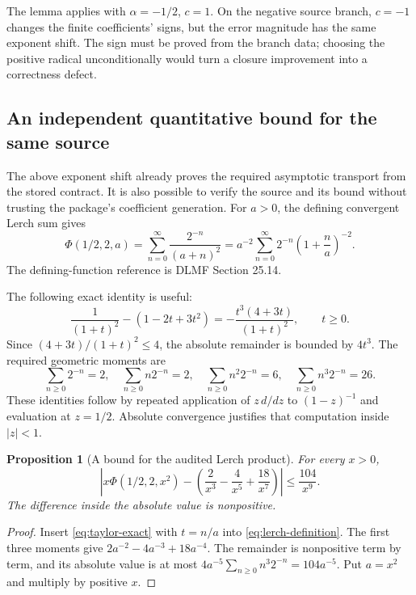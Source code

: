 \documentclass[11pt,a4paper]{article}
\newtheorem{proposition}{Proposition}[section]
\begin{document}
The lemma applies with $\alpha=-1/2$, $c=1$. On the negative source branch, $c=-1$ changes the finite coefficients' signs, but the error magnitude has the same exponent shift. The sign must be proved from the branch data; choosing the positive radical unconditionally would turn a closure improvement into a correctness defect.

\subsection{An independent quantitative bound for the same source}
The above exponent shift already proves the required asymptotic transport from the stored contract. It is also possible to verify the source and its bound without trusting the package's coefficient generation. For $a>0$, the defining convergent Lerch sum gives
\begin{equation}
 \Phi(1/2,2,a)=\sum_{n=0}^{\infty}\frac{2^{-n}}{(a+n)^2}
 =a^{-2}\sum_{n=0}^{\infty}2^{-n}\left(1+\frac n a\right)^{-2}.
 \label{eq:lerch-definition}
\end{equation}
The defining-function reference is DLMF Section 25.14.\cite{dlmf-lerch}

The following exact identity is useful:
\begin{equation}
 \frac{1}{(1+t)^2}-(1-2t+3t^2)
 =-\frac{t^3(4+3t)}{(1+t)^2},\qquad t\ge0.
 \label{eq:taylor-exact}
\end{equation}
Since $(4+3t)/(1+t)^2\le4$, the absolute remainder is bounded by $4t^3$. The required geometric moments are
\begin{equation}
 \sum_{n\ge0}2^{-n}=2,\quad
 \sum_{n\ge0}n2^{-n}=2,\quad
 \sum_{n\ge0}n^2 2^{-n}=6,\quad
 \sum_{n\ge0}n^3 2^{-n}=26.
 \label{eq:moments}
\end{equation}
These identities follow by repeated application of $z\,d/dz$ to $(1-z)^{-1}$ and evaluation at $z=1/2$. Absolute convergence justifies that computation inside $|z|<1$.

\begin{proposition}[A bound for the audited Lerch product]
For every $x>0$,
\begin{equation}
 \left|x\Phi(1/2,2,x^2)
 -\left(\frac2{x^3}-\frac4{x^5}+\frac{18}{x^7}\right)\right|
 \le\frac{104}{x^9}.
 \label{eq:lerch-numeric-bound}
\end{equation}
The difference inside the absolute value is nonpositive.
\end{proposition}
\begin{proof}
Insert \eqref{eq:taylor-exact} with $t=n/a$ into \eqref{eq:lerch-definition}. The first three moments give $2a^{-2}-4a^{-3}+18a^{-4}$. The remainder is nonpositive term by term, and its absolute value is at most
$4a^{-5}\sum_{n\ge0}n^3 2^{-n}=104a^{-5}$.
Put $a=x^2$ and multiply by positive $x$.
\end{proof}
\end{document}
